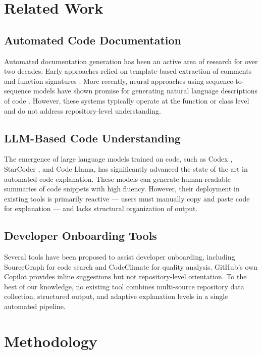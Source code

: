 \documentclass[conference]{IEEEtran}
\begin{document}
\section{Related Work}

\subsection{Automated Code Documentation}

Automated documentation generation has been an active area of research for over two decades. Early approaches relied on template-based extraction of comments and function signatures \cite{b3}. More recently, neural approaches using sequence-to-sequence models have shown promise for generating natural language descriptions of code \cite{b4}. However, these systems typically operate at the function or class level and do not address repository-level understanding.

\subsection{LLM-Based Code Understanding}

The emergence of large language models trained on code, such as Codex \cite{b2}, StarCoder \cite{b5}, and Code Llama, has significantly advanced the state of the art in automated code explanation. These models can generate human-readable summaries of code snippets with high fluency. However, their deployment in existing tools is primarily reactive --- users must manually copy and paste code for explanation --- and lacks structural organization of output.

\subsection{Developer Onboarding Tools}

Several tools have been proposed to assist developer onboarding, including SourceGraph for code search and CodeClimate for quality analysis. GitHub's own Copilot provides inline suggestions but not repository-level orientation. To the best of our knowledge, no existing tool combines multi-source repository data collection, structured output, and adaptive explanation levels in a single automated pipeline.

\section{Methodology}
\end{document}
